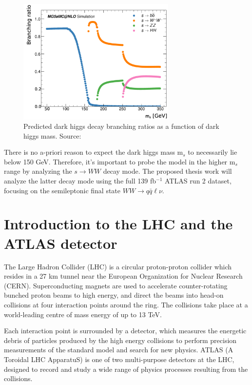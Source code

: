 \documentclass[12pt]{article}
\begin{document}
\begin{figure}[H]
	\centering
	\includegraphics[width=0.7\textwidth]{figures/BR_vs_mass.png}
	\caption[]{Predicted dark higgs decay branching ratios as a function of dark higgs mass. Source: \cite{monohbb_recast} }
	\label{fig:higgsbrs}
\end{figure}

There is no a-priori reason to expect the dark higgs mass m$_s$ to necessarily lie below 150 GeV. Therefore, it's important to probe the model in the higher m$_s$ range by analyzing the $s \rightarrow WW$ decay mode. The proposed thesis work will analyze the latter decay mode using the full 139 fb$^{-1}$ ATLAS run 2 dataset, focusing on the semileptonic final state $WW \rightarrow q\bar{q}\ell\nu$.

\newpage

\section{Introduction to the LHC and the ATLAS detector}

The Large Hadron Collider (LHC) \cite{lhc_machine} is a circular proton-proton collider which resides in a 27 km tunnel near the European Organization for Nuclear Research (CERN). Superconducting magnets are used to accelerate counter-rotating bunched proton beams to high energy, and direct the beams into head-on collisions at four interaction points around the ring. The collisions take place at a world-leading centre of mass energy of up to 13 TeV. 

Each interaction point is surrounded by a detector, which measures the energetic debris of particles produced by the high energy collisions to perform precision measurements of the standard model and search for new physics. ATLAS (A Toroidal LHC ApparatuS) \cite{atlas} is one of two multi-purpose detectors at the LHC, designed to record and study a wide range of physics processes resulting from the collisions. 
\end{document}
